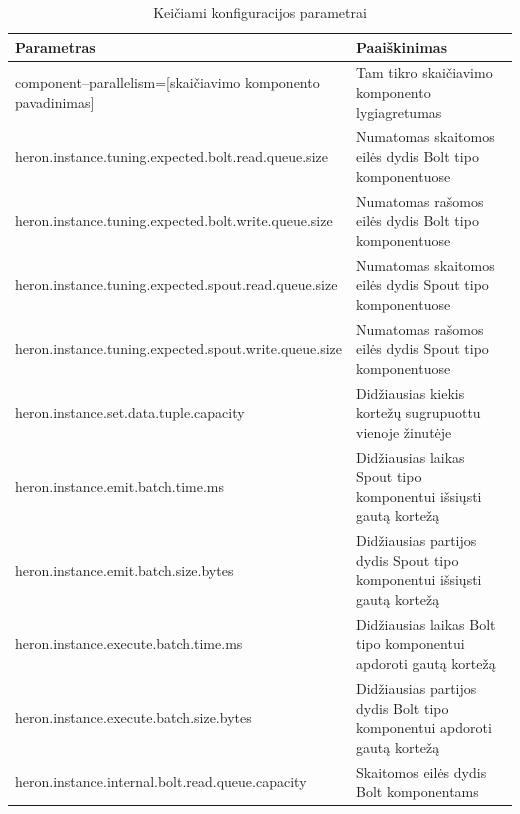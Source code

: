 \documentclass{VUMIFPSbakalaurinis}
\begin{document}
\begin{longtable}{|p{0.59\linewidth}|p{0.41\linewidth}|}
    \caption{Keičiami konfiguracijos parametrai}
    \label{param–table}\\
    \hline
    \rowcolor[HTML]{C0C0C0} 
    Parametras                                              & Paaiškinimas                                                                                 \\ \hline
    \endfirsthead
    \endhead
    component–parallelism=[skaičiavimo komponento pavadinimas]            & Tam tikro skaičiavimo komponento lygiagretumas                                 \\ \hline
    heron.instance.tuning.expected.bolt.read.queue.size                   & Numatomas skaitomos eilės dydis Bolt tipo komponentuose                        \\ \hline
    heron.instance.tuning.expected.bolt.write.queue.size                  & Numatomas rašomos eilės dydis Bolt tipo komponentuose                          \\ \hline
    heron.instance.tuning.expected.spout.read.queue.size                  & Numatomas skaitomos eilės dydis Spout tipo komponentuose                       \\ \hline
    heron.instance.tuning.expected.spout.write.queue.size                 & Numatomas rašomos eilės dydis Spout tipo komponentuose                         \\ \hline
    heron.instance.set.data.tuple.capacity                                & Didžiausias kiekis kortežų sugrupuottu vienoje žinutėje                        \\ \hline
    heron.instance.emit.batch.time.ms                                     & Didžiausias laikas Spout tipo komponentui išsiųsti gautą kortežą               \\ \hline
    heron.instance.emit.batch.size.bytes                                  & Didžiausias partijos dydis Spout tipo komponentui išsiųsti gautą kortežą       \\ \hline
    heron.instance.execute.batch.time.ms                                  & Didžiausias laikas Bolt tipo komponentui apdoroti gautą kortežą                \\ \hline
    heron.instance.execute.batch.size.bytes                               & Didžiausias partijos dydis Bolt tipo komponentui apdoroti gautą kortežą        \\ \hline
    heron.instance.internal.bolt.read.queue.capacity                      & Skaitomos eilės dydis Bolt komponentams                                        \\ \hline

\end{longtable}
\end{document}
